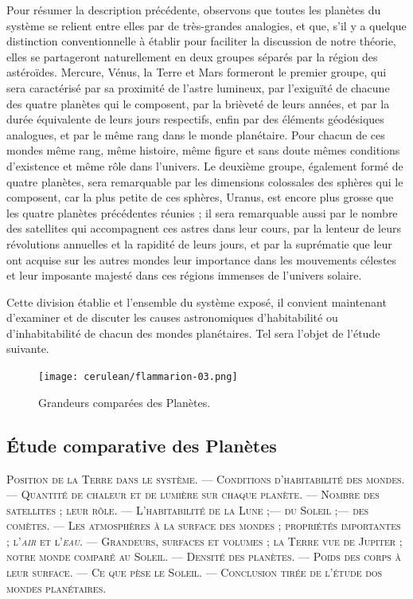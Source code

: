 \documentclass[a4paper, 11pt, oneside, landscape]{article}
\begin{document}
Pour résumer la description précédente, observons que toutes les planètes du système se relient entre elles par de très-grandes analogies, et que, s'il y a quelque distinction conventionnelle à établir pour faciliter la discussion de notre théorie, elles se partageront naturellement en deux groupes séparés par la région des astéroïdes. Mercure, Vénus, la Terre et Mars formeront le premier groupe, qui sera caractérisé par sa proximité de l'astre lumineux, par l'exiguïté de chacune des quatre planètes qui le composent, par la brièveté de leurs années, et par la durée équivalente de leurs jours respectifs, enfin par des éléments géodésiques analogues, et par le même rang dans le monde planétaire. Pour chacun de ces mondes même rang, même histoire, même figure et sans doute mêmes conditions d'existence et même rôle dans l'univers. Le deuxième groupe, également formé de quatre planètes, sera remarquable par les dimensions colossales des sphères qui le composent, car la plus petite de ces sphères, Uranus, est encore plus grosse que les quatre planètes précédentes réunies ; il sera remarquable aussi par le nombre des satellites qui accompagnent ces astres dans leur cours, par la lenteur de leurs révolutions annuelles et la rapidité de leurs jours, et par la suprématie que leur ont acquise sur les autres mondes leur importance dans les mouvements célestes et leur imposante majesté dans ces régions immenses de l'univers solaire.

Cette division établie et l'ensemble du système exposé, il convient maintenant d'examiner et de discuter les causes astronomiques d'habitabilité ou d'inhabitabilité de chacun des mondes planétaires. Tel sera l'objet de l'étude suivante.
\clearpage
\begin{landscape}
\vspace*{\fill}
\begin{figure}[H]
\centering
\texttt{[image: cerulean/flammarion-03.png]}
\caption{Grandeurs comparées des Planètes.}
\end{figure}
\vspace*{\fill}
\end{landscape}
\clearpage
\subsection{Étude comparative des Planètes}
\begin{center}
\scshape
\small
Position de la Terre dans le système. --- Conditions d'habitabilité des mondes. --- Quantité de chaleur et de lumière sur chaque planète. --- Nombre des satellites ; leur rôle. --- L'habitabilité de la Lune ;--- du Soleil ;--- des comètes. --- Les atmosphères à la surface des mondes ; propriétés importantes ; l'\emph{air} et l'\emph{eau}. --- Grandeurs, surfaces et volumes ; la Terre vue de Jupiter ; notre monde comparé au Soleil. --- Densité des planètes. --- Poids des corps à leur surface. --- Ce que pèse le Soleil. --- Conclusion tirée de l'étude dos mondes planétaires.
\end{center}
\end{document}
